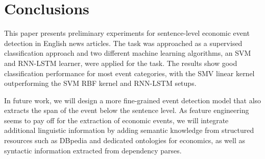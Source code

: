 \documentclass[11pt,a4paper]{article}
\begin{document}
\section{Conclusions}
This paper presents preliminary experiments for sentence-level economic event detection in English news articles. The task was approached as a supervised classification approach and two different machine learning algorithms, an SVM and RNN-LSTM learner, were applied for the task. The results show good classification performance for most event categories, with the SMV linear kernel outperforming the SVM RBF kernel and RNN-LSTM setups. 

In future work, we will design a more fine-grained event detection model that also extracts the span of the event below the sentence level. As feature engineering seems to pay off for the extraction of economic events, we will integrate additional linguistic information by adding semantic knowledge from structured resources such as 
DBpedia and dedicated ontologies for economics, as well as syntactic information extracted from dependency parses.



\end{document}

